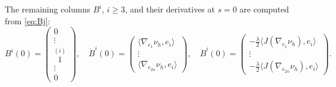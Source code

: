 \documentclass[10pt]{amsart}
\theoremstyle{definition}
\theoremstyle{remark}
\numberwithin{equation}{section}
\begin{document}
The remaining columns $B^i$, $i{\geqslant} 3$, and their derivatives at $s=0$ are computed from \eqref{eq:Bj}:
\[
B^i(0)=\begin{pmatrix} 0 \\ \vdots \\ \stackrel{(i)}{1} \\ \vdots\\ 0 \end{pmatrix}, \quad
\dot{B}^i(0)=\begin{pmatrix} {\langle{\nabla_{e_1}{\nu_{h}},e_i}\rangle} \\ \vdots \\ {\langle{\nabla_{e_{2n}}{\nu_{h}},e_i}\rangle}\end{pmatrix},\quad
\ddot{B}^i(0)=\begin{pmatrix} -\tfrac{\lambda}{2}{\langle{J(\nabla_{e_1}{\nu_{h}}),e_i}\rangle} \\ \vdots \\ -\tfrac{\lambda}{2}{\langle{J(\nabla_{e_{2n}}{\nu_{h}}),e_i}\rangle}\end{pmatrix}.
\]
\end{document}
